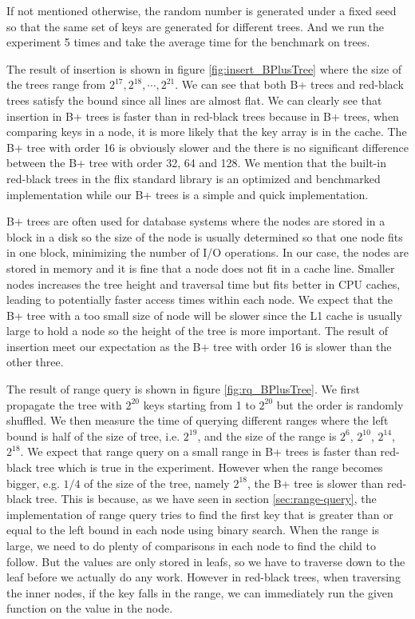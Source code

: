 \documentclass[11pt]{report}
\theoremstyle{definition}
\begin{document}
If not mentioned otherwise, the random number is generated under a fixed seed so that the same set of keys are generated for different trees. And we run the experiment 5 times and take the average time for the benchmark on trees.

The result of insertion is shown in figure \ref{fig:insert_BPlusTree} where the size of the trees range from $2^{17}, 2^{18}, \cdots, 2^{21}$. We can see that both B+ trees and red-black trees satisfy the bound since all lines are almost flat. We can clearly see that insertion in B+ trees is faster than in red-black trees because in B+ trees, when comparing keys in a node, it is more likely that the key array is in the cache. The B+ tree with order 16 is obviously slower and the there is no significant difference between the B+ tree with order 32, 64 and 128. We mention that the built-in red-black trees in the flix standard library is an optimized and benchmarked implementation while our B+ trees is a simple and quick implementation.

B+ trees are often used for database systems where the nodes are stored in a block in a disk so the size of the node is usually determined so that one node fits in one block, minimizing the number of I/O operations. In our case, the nodes are stored in memory and it is fine that a node does not fit in a cache line. Smaller nodes increases the tree height and traversal time but fits better in CPU caches, leading to potentially faster access times within each node. We expect that the B+ tree with a too small size of node will be slower since the L1 cache is usually large to hold a node so the height of the tree is more important. The result of insertion meet our expectation as the B+ tree with order 16 is slower than the other three.

The result of range query is shown in figure \ref{fig:rq_BPlusTree}. We first propagate the tree with $2^{20}$ keys starting from 1 to $2^{20}$ but the order is randomly shuffled. We then measure the time of querying different ranges where the left bound is half of the size of tree, i.e. $2^{19}$, and the size of the range is $2^6$, $2^10$, $2^{14}$, $2^{18}$. We expect that range query on a small range in B+ trees is faster than red-black tree which is true in the experiment. However when the range becomes bigger, e.g. $1/4$ of the size of the tree, namely $2^{18}$, the B+ tree is slower than red-black tree. This is because, as we have seen in section \ref{sec:range-query}, the implementation of range query tries to find the first key that is greater than or equal to the left bound in each node using binary search. When the range is large, we need to do plenty of comparisons in each node to find the child to follow. But the values are only stored in leafs, so we have to traverse down to the leaf before we actually do any work. However in red-black trees, when traversing the inner nodes, if the key falls in the range, we can immediately run the given function on the value in the node.
\end{document}
